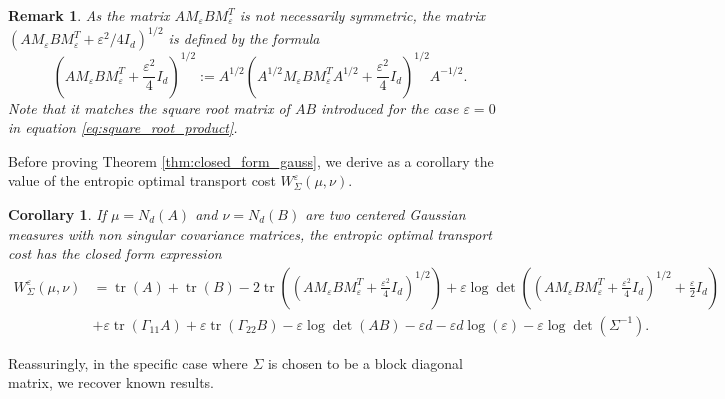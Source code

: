 \documentclass[]{article}
\DeclareMathOperator{\tr}{tr}
\numberwithin{equation}{section}
\theoremstyle{plain}
\newtheorem{rem}{Remark}[section]
\newtheorem{cor}{Corollary}[section]
\begin{document}
\begin{rem}
	As the matrix $AM_\varepsilon B M_{\varepsilon}^T$ is not necessarily symmetric, the matrix $( AM_\varepsilon BM_\varepsilon^T +\varepsilon^2/4I_d)^{1/2}$ is defined by the formula
	\begin{equation}\label{eq:square_root_mat_regularized}
		\left(AM_\varepsilon BM_\varepsilon^T +\frac{\varepsilon^2}{4}I_d\right)^{1/2} := A^{1/2}\left( A^{1/2}M_{\varepsilon}BM_{\varepsilon}^T A^{1/2} +\frac{\varepsilon^2}{4}I_d\right)^{1/2}A^{-1/2}.
	\end{equation}
	Note that it matches the square root matrix of $AB$ introduced for the case $\varepsilon=0$ in equation \eqref{eq:square_root_product}.
\end{rem}

Before proving Theorem \ref{thm:closed_form_gauss}, we derive as a corollary the value of the entropic optimal transport cost $W_\Sigma^{\varepsilon}(\mu, \nu)$.
\begin{cor}\label{cor:closed_form_gauss}
If $\mu=N_d(A)$ and $\nu = N_d(B)$ are two centered Gaussian measures with non singular covariance matrices, the entropic optimal transport cost has the closed form expression
    \begin{align}
    W_\Sigma^{\varepsilon}(\mu, \nu)& = \tr(A) + \tr(B) - 2 \tr\left( \left(AM_\varepsilon B M_\varepsilon^T+ \frac{\varepsilon^2}{4}I_d \right)^{1/2} \right) + \varepsilon \log \det\left( \left(A M_\varepsilon B M_\varepsilon^T+ \frac{\varepsilon^2}{4}I_d\right)^{1/2}+\frac{\varepsilon}{2}I_d  \right)  \nonumber \\
   &+\varepsilon \tr (\Gamma_{11} A )  +\varepsilon \tr (\Gamma_{22} B) - \varepsilon \log \det(AB) - \varepsilon d - \varepsilon d \log(\varepsilon) - \varepsilon\log \det(\Sigma^{-1}).
    \end{align}
\end{cor}

Reassuringly, in the specific case where $\Sigma$ is chosen to be a block diagonal matrix, we recover known results.
\end{document}
